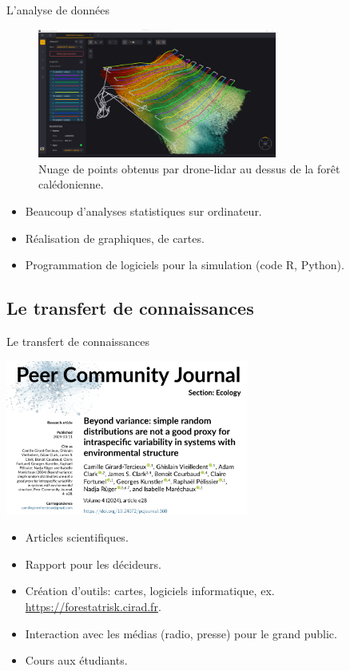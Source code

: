 \documentclass[10pt,table,dvipsnames,compress]{beamer}
\begin{document}
\begin{frame}[label={sec:org0f1e278}]{L'analyse de données}
\begin{figure}[htbp]
\centering
\includegraphics[width=0.7\textwidth]{figs/drone-analyse-de-donnees.png}
\caption{Nuage de points obtenus par drone-lidar au dessus de la forêt calédonienne.}
\end{figure}

\begin{itemize}
\item Beaucoup d'analyses statistiques sur ordinateur.
\item Réalisation de graphiques, de cartes.
\item Programmation de logiciels pour la simulation (code R, Python).
\end{itemize}
\end{frame}
\subsection{Le transfert de connaissances}
\label{sec:org410d966}

\begin{frame}[label={sec:org7937585}]{Le transfert de connaissances}
\begin{center}
\includegraphics[width=0.6\textwidth]{figs/ecriture-article-scientifique.png}
\end{center}

\begin{itemize}
\item Articles scientifiques.
\item Rapport pour les décideurs.
\item Création d'outils: cartes, logiciels informatique, ex. \url{https://forestatrisk.cirad.fr}.
\item Interaction avec les médias (radio, presse) pour le grand public.
\item Cours aux étudiants.
\end{itemize}
\end{frame}
\end{document}
